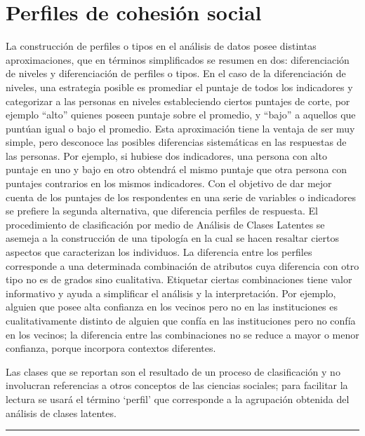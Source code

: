 \documentclass[
  12pt,
]{book}
\begin{document}
\hypertarget{perfiles-de-cohesiuxf3n-social}{%
\section{Perfiles de cohesión social}\label{perfiles-de-cohesiuxf3n-social}}

La construcción de perfiles o tipos en el análisis de datos posee distintas aproximaciones, que en términos simplificados se resumen en dos: diferenciación de niveles y diferenciación de perfiles o tipos. En el caso de la diferenciación de niveles, una estrategia posible es promediar el puntaje de todos los indicadores y categorizar a las personas en niveles estableciendo ciertos puntajes de corte, por ejemplo ``alto'' quienes poseen puntaje sobre el promedio, y ``bajo'' a aquellos que puntúan igual o bajo el promedio. Esta aproximación tiene la ventaja de ser muy simple, pero desconoce las posibles diferencias sistemáticas en las respuestas de las personas. Por ejemplo, si hubiese dos indicadores, una persona con alto puntaje en uno y bajo en otro obtendrá el mismo puntaje que otra persona con puntajes contrarios en los mismos indicadores. Con el objetivo de dar mejor cuenta de los puntajes de los respondentes en una serie de variables o indicadores se prefiere la segunda alternativa, que diferencia perfiles de respuesta. El procedimiento de clasificación por medio de Análisis de Clases Latentes se asemeja a la construcción de una tipología en la cual se hacen resaltar ciertos aspectos que caracterizan los individuos. La diferencia entre los perfiles corresponde a una determinada combinación de atributos cuya diferencia con otro tipo no es de grados sino cualitativa. Etiquetar ciertas combinaciones tiene valor informativo y ayuda a simplificar el análisis y la interpretación. Por ejemplo, alguien que posee alta confianza en los vecinos pero no en las instituciones es cualitativamente distinto de alguien que confía en las instituciones pero no confía en los vecinos; la diferencia entre las combinaciones no se reduce a mayor o menor confianza, porque incorpora contextos diferentes.

Las clases que se reportan son el resultado de un proceso de clasificación y no involucran referencias a otros conceptos de las ciencias sociales; para facilitar la lectura se usará el término `perfil' que corresponde a la agrupación obtenida del análisis de clases latentes.

\begin{center}\rule{0.5\linewidth}{0.5pt}\end{center}
\end{document}
